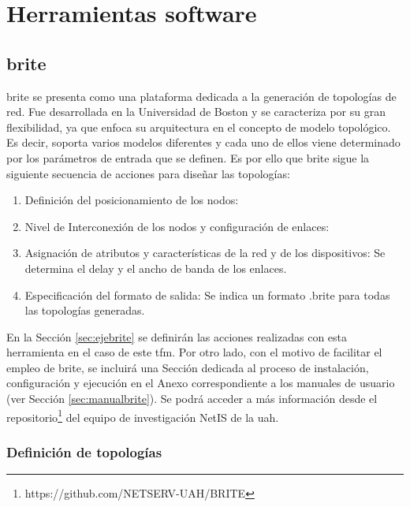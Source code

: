 \section{Herramientas software}
\label{sec:software}

\subsection{\acrshort{brite}}
\label{sec:brite}

\gls{brite} \cite{brite} se presenta como una plataforma dedicada a la generación de topologías de red. Fue desarrollada en la Universidad de Boston y se caracteriza por su gran flexibilidad, ya que enfoca su arquitectura en el concepto de modelo topológico. Es decir, soporta varios modelos diferentes y cada uno de ellos viene determinado por los parámetros de entrada que se definen. Es por ello que \gls{brite} sigue la siguiente secuencia de acciones para diseñar las topologías:

\vspace{3mm}

\begin{enumerate}
    \item Definición del posicionamiento de los nodos:
    \item Nivel de Interconexión de los nodos y configuración de enlaces:
    \item Asignación de atributos y características de la red y de los dispositivos: Se determina el delay y el ancho de banda de los enlaces.
    \item Especificación del formato de salida: Se indica un formato .brite para todas las topologías generadas.
\end{enumerate}

\vspace{3mm}

En la Sección \ref{sec:ejebrite} se definirán las acciones realizadas con esta herramienta en el caso de este \gls{tfm}. Por otro lado, con el motivo de facilitar el empleo de \gls{brite}, se incluirá una Sección dedicada al proceso de instalación, configuración y ejecución en el Anexo correspondiente a los manuales de usuario (ver Sección \ref{sec:manualbrite}). Se podrá acceder a más información desde el repositorio\footnote{https://github.com/NETSERV-UAH/BRITE} del equipo de investigación NetIS de la \gls{uah}.

\subsubsection{Definición de topologías}
\label{sec:param}

